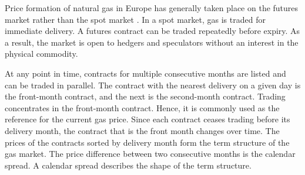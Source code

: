 Price formation of natural gas in Europe has generally taken place on the futures market rather than the spot market \parencite{obadiDRIVINGFUNDAMENTALSNATURAL2020}. In a spot market, gas is traded for immediate delivery. A futures contract can be traded repeatedly before expiry. As a result, the market is open to hedgers and speculators without an interest in the physical commodity.

At any point in time, contracts for multiple consecutive months are listed and can be traded in parallel. The contract with the nearest delivery on a given day is the front-month contract, and the next is the second-month contract. Trading concentrates in the front-month contract. Hence, it is commonly used as the reference for the current gas price. Since each contract ceases trading before its delivery month, the contract that is the front month changes over time. The prices of the contracts sorted by delivery month form the term structure of the gas market. The price difference between two consecutive months is the calendar spread. A calendar spread describes the shape of the term structure. 